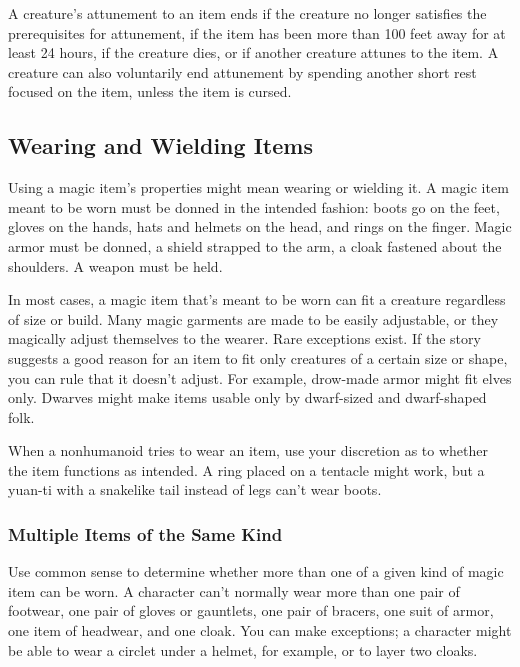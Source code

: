 \documentclass[
]{article}
\begin{document}
A creature's attunement to an item ends if the creature no longer
satisfies the prerequisites for attunement, if the item has been more
than 100 feet away for at least 24 hours, if the creature dies, or if
another creature attunes to the item. A creature can also voluntarily
end attunement by spending another short rest focused on the item,
unless the item is cursed.

\hypertarget{wearing-and-wielding-items}{%
\subsection{Wearing and Wielding
Items}\label{wearing-and-wielding-items}}

Using a magic item's properties might mean wearing or wielding it. A
magic item meant to be worn must be donned in the intended fashion:
boots go on the feet, gloves on the hands, hats and helmets on the head,
and rings on the finger. Magic armor must be donned, a shield strapped
to the arm, a cloak fastened about the shoulders. A weapon must be held.

In most cases, a magic item that's meant to be worn can fit a creature
regardless of size or build. Many magic garments are made to be easily
adjustable, or they magically adjust themselves to the wearer. Rare
exceptions exist. If the story suggests a good reason for an item to fit
only creatures of a certain size or shape, you can rule that it doesn't
adjust. For example, drow-made armor might fit elves only. Dwarves might
make items usable only by dwarf-sized and dwarf-shaped folk.

When a nonhumanoid tries to wear an item, use your discretion as to
whether the item functions as intended. A ring placed on a tentacle
might work, but a yuan-ti with a snakelike tail instead of legs can't
wear boots.

\hypertarget{multiple-items-of-the-same-kind}{%
\subsubsection{Multiple Items of the Same
Kind}\label{multiple-items-of-the-same-kind}}

Use common sense to determine whether more than one of a given kind of
magic item can be worn. A character can't normally wear more than one
pair of footwear, one pair of gloves or gauntlets, one pair of bracers,
one suit of armor, one item of headwear, and one cloak. You can make
exceptions; a character might be able to wear a circlet under a helmet,
for example, or to layer two cloaks.
\end{document}
